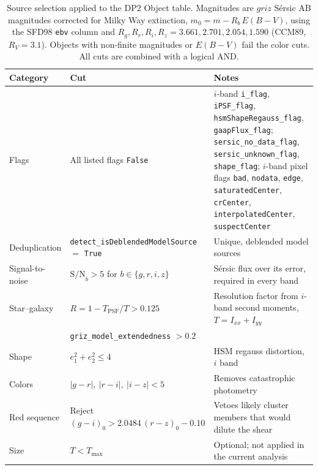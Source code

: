 \begin{table}
\centering
\caption{Source selection applied to the DP2 Object table. Magnitudes are $griz$ S\'ersic AB magnitudes corrected for Milky Way extinction, $m_0 = m - R_b\,E(B-V)$, using the SFD98 \texttt{ebv} column and $R_g, R_r, R_i, R_z = 3.661, 2.701, 2.054, 1.590$ (CCM89, $R_V = 3.1$). Objects with non-finite magnitudes or $E(B-V)$ fail the color cuts. All cuts are combined with a logical AND.}
\label{tab:selection_cuts}
\begin{tabular}{@{}l l >{\raggedright\arraybackslash}p{}@{}}
\toprule
Category & Cut & Notes \\
\midrule
\addlinespace[2pt]
Flags
  & All listed flags \texttt{False}
  & $i$-band \texttt{i\_flag}, \texttt{iPSF\_flag}, \texttt{hsmShapeRegauss\_flag}, \texttt{gaapFlux\_flag}; \texttt{sersic\_no\_data\_flag}, \texttt{sersic\_unknown\_flag}, \texttt{shape\_flag}; $i$-band pixel flags \texttt{bad}, \texttt{nodata}, \texttt{edge}, \texttt{saturatedCenter}, \texttt{crCenter}, \texttt{interpolatedCenter}, \texttt{suspectCenter} \\
Deduplication
  & \texttt{detect\_isDeblendedModelSource} $=$ \texttt{True}
  & Unique, deblended model sources \\
Signal-to-noise
  & $\mathrm{S/N}_b > 5$ for $b \in \{g,r,i,z\}$
  & S\'ersic flux over its error, required in every band \\
Star--galaxy
  & $R = 1 - T_\mathrm{PSF}/T > 0.125$
  & Resolution factor from $i$-band second moments, $T = I_{xx} + I_{yy}$ \\
  & \texttt{griz\_model\_extendedness} $> 0.2$
  & \\
Shape
  & $e_1^2 + e_2^2 \le 4$
  & HSM regauss distortion, $i$ band \\
Colors
  & $|g-r|,\ |r-i|,\ |i-z| < 5$
  & Removes catastrophic photometry \\
Red sequence
  & Reject $(g-i)_0 > 2.0484\,(r-z)_0 - 0.10$
  & Vetoes likely cluster members that would dilute the shear \\
Size
  & $T < T_\mathrm{max}$
  & Optional; not applied in the current analysis \\
\bottomrule
\end{tabular}
\end{table}
